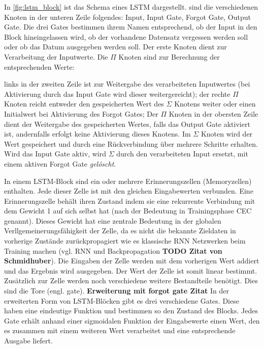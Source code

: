 In \autoref{fig:lstm_block} ist das Schema eines \ac{LSTM} dargestellt. sind die
verschiedenen Knoten in der unteren Zeile folgendes: Input, Input Gate, Forgot
Gate, Output Gate. Die drei Gates bestimmen ihrem Namen entsprechend, ob der
Input in den Block hineingelassen wird, ob der vorhandene Datensatz vergessen
werden soll oder ob das Datum ausgegeben werden soll. Der erste Knoten dient zur
Verarbeitung der Inputwerte. Die $\Pi$ Knoten sind zur Berechnung der
entsprechenden Werte:

links in der zweiten Zeile ist zur Weitergabe des verarbeiteten Inputwertes
(bei Aktivierung durch das Input Gate wird dieser weitergereicht); der rechte
$\Pi$ Knoten reicht entweder den gespeicherten Wert des $\Sigma$ Knotens weiter
oder einen Initialwert bei Aktivierung des Forgot Gates; Der $\Pi$ Knoten in der
obersten Zeile dient der Weitergabe des gespeicherten Wertes, falls das Output
Gate aktiviert ist, andernfalls erfolgt keine Aktivierung dieses Knotens. Im
$\Sigma$ Knoten wird der Wert gespeichert und durch eine Rückverbindung über
mehrere Schritte erhalten. Wird das Input Gate aktiv, wird $\Sigma$ durch den
verarbeiteten Input ersetzt, mit einem aktiven Forgot Gate \textit{gelöscht}. 

In einem \ac{LSTM}-Block sind ein oder mehrere Erinnerungszellen (Memoryzellen)
enthalten. Jede dieser Zelle ist mit den gleichen Eingabewerten verbunden. Eine Erinnerungszelle
behält ihren Zustand indem sie eine rekurrente Verbindung mit dem Gewicht 1 auf
sich selbst hat (nach der Bedeutung in Trainingsphase \ac{CEC} genannt).
Dieses Gewicht hat eine zentrale Bedeutung in der globalen Verllgemeinerungsfähigkeit der Zelle, da es nicht die bekannte Zieldaten in
vorherige Zustände zurückpropagiert wie es klassische \ac{RNN} Netzwerken beim
Training machen (vgl. \ac{RNN} und Backpropagation \textbf{TODO Zitat von
Schmidhuber}). Die Eingaben der Zelle werden mit dem vorherigen Wert addiert und
das Ergebnis wird ausgegeben. Der Wert der Zelle ist somit linear bestimmt. 
Zusätzlich zur Zelle werden noch verschiedene weitere Bestandteile benötigt. Dies sind die Tore (engl. gate).
\textbf{Erweiterung mit forgot gate Zitat} In der erweiterten Form von
\ac{LSTM}-Blöcken gibt es drei verschiedene Gates.
Diese haben eine eindeutige Funktion und bestimmen so den Zustand des Blocks.
Jedes Gate erhält anhand einer sigmoidalen Funktion der Eingabewerte einen Wert,
den es zusammen mit einem weiteren Wert verarbeitet und eine entsprechende
Ausgabe liefert.



